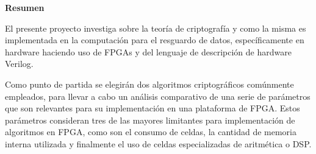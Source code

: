 \begin{center}\huge{\textbf{Resumen}}\end{center}


El presente proyecto investiga sobre la teoría de criptografía y como la misma es implementada en la computación para el resguardo de datos, específicamente en hardware haciendo uso de FPGAs y del lenguaje de descripción de hardware Verilog. 

Como punto de partida se elegirán dos algoritmos criptográficos comúnmente empleados, para llevar a cabo un análisis comparativo de una serie de parámetros que son relevantes para su implementación en una plataforma de FPGA. Estos parámetros consideran tres de las mayores limitantes para implementación de algoritmos en FPGA, como son el consumo de celdas, la cantidad de memoria interna utilizada y finalmente el uso de celdas especializadas de aritmética o DSP.
